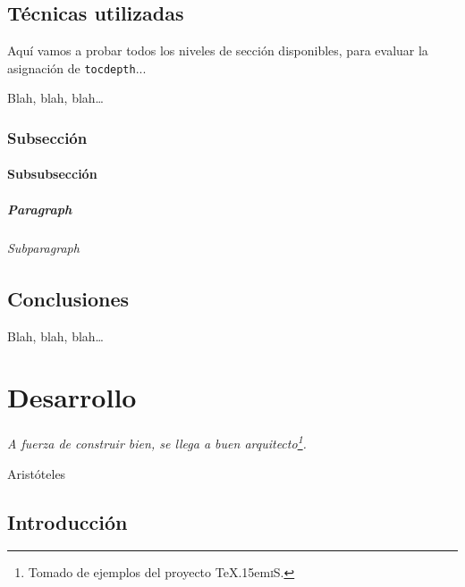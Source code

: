 \documentclass[spanish,openright]{book}
\def\texis{\TeX \raise.15em\hbox{\textsc{i}}S}
\newenvironment{FraseCelebre}{\begin{list}{}{\setlength{\leftmargin}{0.5\textwidth}\setlength{\parsep}{0cm}\addtolength{\topsep}{0.5cm}}
  }
  {\unskip \end{list}}
\newenvironment{Frase}{\item \begin{flushright}\small\em}{\end{flushright}}
\newenvironment{Fuente}{\item \begin{flushright}\small}{\end{flushright}}
\begin{document}
\section{Técnicas utilizadas}
\label{sec:tecnicas-utilizadas}

Aquí vamos a probar todos los niveles de sección disponibles, para
evaluar la asignación de \texttt{tocdepth}...

Blah, blah, blah\ldots


\subsection{Subsección}
\label{sec:subseccion}


\subsubsection{Subsubsección}
\label{sec:subsubseccion}

\paragraph{Paragraph}
\label{sec:paragraph-1}


\subparagraph{Subparagraph}
\label{sec:subparagraph}



\section{Conclusiones}
\label{sec:conclusiones-teoria}

Blah, blah, blah\ldots

 


\chapter{Desarrollo}
\label{cha:desarrollo}


\begin{FraseCelebre}
  \begin{Frase}
    A fuerza de construir bien, se llega a buen
    arquitecto\footnote{Tomado de ejemplos del proyecto \texis{}.}.
  \end{Frase}
  \begin{Fuente}
    Aristóteles
  \end{Fuente}
\end{FraseCelebre}

\section{Introducción}
\label{sec:introduccion-desarrollo}
\end{document}
